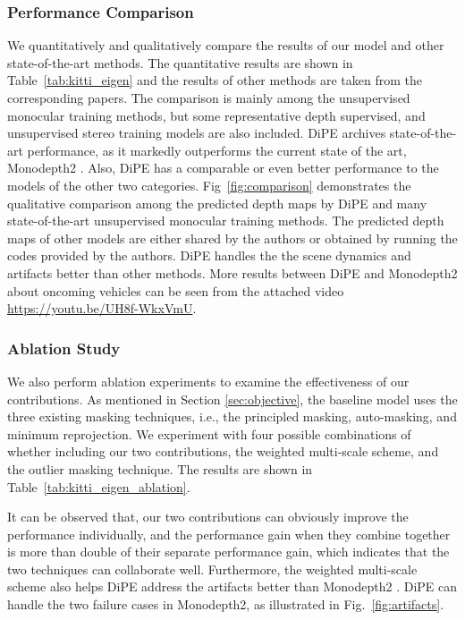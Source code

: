 \documentclass[letterpaper, 10 pt, conference]{ieeeconf}
\begin{document}
\subsubsection{Performance Comparison}
We quantitatively and qualitatively compare the results of our model and other state-of-the-art methods. 
The quantitative results are shown in Table~\ref{tab:kitti_eigen} and the results of other methods are taken from the corresponding papers. 
The comparison is mainly among the unsupervised monocular training methods, but some representative depth supervised, and unsupervised stereo training models are also included. 
DiPE archives state-of-the-art performance, as it markedly outperforms the current state of the art, Monodepth2 \cite{godard2019digging}. 
Also, DiPE has a comparable or even better performance to the models of the other two categories. 
Fig~\ref{fig:comparison} demonstrates the qualitative comparison among the predicted depth maps by DiPE and many state-of-the-art unsupervised monocular training methods. The predicted depth maps of other models are either shared by the authors or obtained by running the codes provided by the authors. DiPE handles the the scene dynamics and artifacts better than other methods. More results between DiPE and Monodepth2 \cite{godard2019digging} about oncoming vehicles can be seen from the attached video \url{https://youtu.be/UH8f-WkxVmU}. 


\subsubsection{Ablation Study}

We also perform ablation experiments to examine the effectiveness of our contributions. 
As mentioned in Section \ref{sec:objective}, the baseline model uses the three existing masking techniques, i.e., the principled masking, auto-masking, and minimum reprojection. We experiment with four possible combinations of whether including our two contributions, the weighted multi-scale scheme, and the outlier masking technique. 
The results are shown in Table~\ref{tab:kitti_eigen_ablation}. 

It can be observed that, our two contributions can obviously improve the performance individually, and the performance gain when they combine together is more than double of their separate performance gain, which indicates that the two techniques can collaborate well. Furthermore, the weighted multi-scale scheme also helps DiPE address the artifacts better than Monodepth2 \cite{godard2019digging}. DiPE can handle the two failure cases in Monodepth2, as illustrated in Fig.~\ref{fig:artifacts}. 
\end{document}
